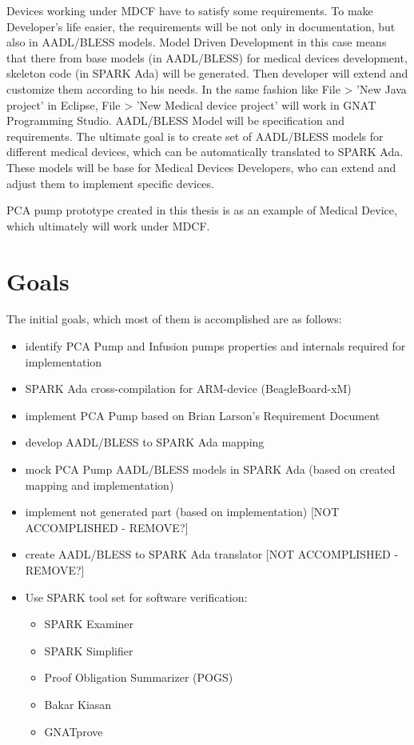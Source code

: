 Devices working under MDCF have to satisfy some requirements. To make Developer's life easier, the requirements will be not only in documentation, but also in AADL/BLESS models. Model Driven Development in this case means that there from base models (in AADL/BLESS) for medical devices development, skeleton code (in SPARK Ada) will be generated. Then developer will extend and customize them according to his needs. In the same fashion like File > 'New Java project' in Eclipse, File > 'New Medical device project' will work in GNAT Programming Studio. AADL/BLESS Model will be specification and requirements. The ultimate goal is to create set of AADL/BLESS models for different medical devices, which can be automatically translated to SPARK Ada. These models will be base for Medical Devices Developers, who can extend and adjust them to implement specific devices. 

PCA pump prototype created in this thesis is as an example of Medical Device, which ultimately will work under MDCF.


\section{Goals}
\label{introduction:goals}
The initial goals, which most of them is accomplished are as follows:
\begin{itemize}
	\item identify PCA Pump and Infusion pumps properties and internals required for implementation
	\item SPARK Ada cross-compilation for ARM-device (BeagleBoard-xM)
	\item implement PCA Pump based on Brian Larson's Requirement Document \cite{OpenSourcePCAPump:Paper}
	\item develop AADL/BLESS to SPARK Ada mapping
	\item mock PCA Pump AADL/BLESS models in SPARK Ada (based on created mapping and implementation)
	\item implement not generated part (based on implementation) [NOT ACCOMPLISHED - REMOVE?]
	\item create AADL/BLESS to SPARK Ada translator [NOT ACCOMPLISHED - REMOVE?]
	\item Use SPARK tool set for software verification:
		\begin{itemize}
			\item SPARK Examiner
			\item SPARK Simplifier
			\item Proof Obligation Summarizer (POGS)
			\item Bakar Kiasan
			\item GNATprove
		\end{itemize}
\end{itemize}




